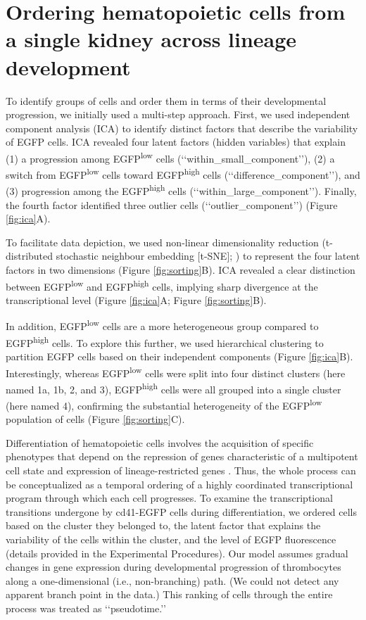 \section{Ordering hematopoietic cells from a single kidney across lineage development}

\begin{sloppypar}
To identify groups of cells and order them in terms of their developmental progression, we initially used a multi-step approach. First, we used independent component analysis (ICA) to identify distinct factors that describe the variability of EGFP cells. ICA revealed four latent factors (hidden variables) that explain (1) a progression among EGFP\textsuperscript{low} cells (‘‘within\_small\_component’’), (2) a switch from EGFP\textsuperscript{low} cells toward EGFP\textsuperscript{high} cells (‘‘difference\_component’’), and (3) progression among the EGFP\textsuperscript{high} cells (‘‘within\_large\_component’’). Finally, the fourth factor identified three outlier cells (‘‘outlier\_component’’) (Figure \ref{fig:ica}A).
\end{sloppypar}

To facilitate data depiction, we used non-linear dimensionality reduction (t-distributed stochastic neighbour embedding [t-SNE];  \cite{Van_der_Maaten2008-lh}) to represent the four latent factors in two dimensions (Figure \ref{fig:sorting}B). ICA revealed a clear distinction between EGFP\textsuperscript{low} and EGFP\textsuperscript{high} cells, implying sharp divergence at the transcriptional level (Figure \ref{fig:ica}A; Figure \ref{fig:sorting}B).

In addition, EGFP\textsuperscript{low} cells are a more heterogeneous group compared to EGFP\textsuperscript{high} cells. To explore this further, we used hierarchical clustering to partition EGFP cells based on their independent components (Figure \ref{fig:ica}B). Interestingly, whereas EGFP\textsuperscript{low} cells were split into four distinct clusters (here named 1a, 1b, 2, and 3), EGFP\textsuperscript{high} cells were all grouped into a single cluster (here named 4), confirming the substantial heterogeneity of the EGFP\textsuperscript{low} population of cells (Figure \ref{fig:sorting}C).

Differentiation of hematopoietic cells involves the acquisition of specific phenotypes that depend on the repression of genes characteristic of a multipotent cell state and expression of lineage-restricted genes  \cite{Seita2010-mk}. Thus, the whole process can be conceptualized as a temporal ordering of a highly coordinated transcriptional program through which each cell progresses. To examine the transcriptional transitions undergone by cd41-EGFP cells during differentiation, we ordered cells based on the cluster they belonged to, the latent factor that explains the variability of the cells within the cluster, and the level of EGFP fluorescence (details provided in the Experimental Procedures). Our model assumes gradual changes in gene expression during developmental progression of thrombocytes along a one-dimensional (i.e., non-branching) path. (We could not detect any apparent branch point in the data.) This ranking of cells through the entire process was treated as ‘‘pseudotime.’’

